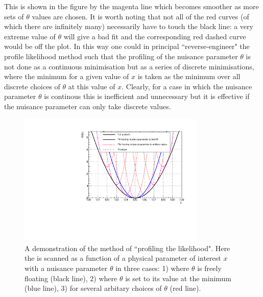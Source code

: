 This is shown in the figure by the magenta line which becomes smoother as more sets of $\theta$ values are chosen. It is worth noting that not all of the red curves (of which there are infinitely many) necessarily have to touch the black line: a very extreme value of $\theta$ will give a bad fit and the corresponding red dashed curve would be off the plot. In this way one could in principal ``reverse-engineer" the profile likelihood method such that the profiling of the nuisance parameter $\theta$ is not done as a continuous minimisation but as a series of discrete minimisations, where the minimum \NLL for a given value of $x$ is taken as the minimum \NLL over all discrete choices of $\theta$ at this value of $x$. Clearly, for a case in which the nuisance parameter $\theta$ is continous this is inefficient and unnecessary but it is effective if the nuisance parameter can only take discrete values.

\begin{figure}
\begin{center}
  \includegraphics[width=0.8\textwidth]{analysis/plots/envelope_explain.pdf}
  \caption{A demonstration of the method of ``profiling the likelihood". Here the \NLL is scanned as a function of a physical parameter of interest $x$ with a nuisance parameter $\theta$ in three cases: 1) where $\theta$ is freely floating (black line), 2) where $\theta$ is set to its value at the \NLL minimum (blue line), 3) for several arbitary choices of $\theta$ (red line).}
  \label{fig:envelope_explain1}
\end{center}
\end{figure}


